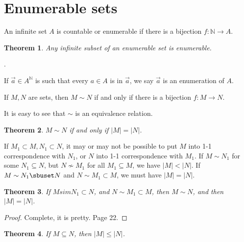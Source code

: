 \documentclass[a4paper, 12pt]{article}
\newtheorem{theorem}{Theorem}
\newtheorem{theorem}{Theorem}
\newtheorem{proof}{Proof}
\begin{document}
\section{Enumerable sets}    

\begin{definition}
    An infinite set $A$ is countable or enumerable if there is a bijection 
    $f : \mathbb{N} \to A$.
\end{definition}

\begin{theorem}
    Any infinite subset of an enumerable set is enumerable.
\end{theorem}

\begin{profe}
    .
\end{profe}

If $\overrightarrow{a} \in A^\mathbb{N}$ is such that every $a \in A$ is in 
$\overrightarrow{a}$, we say $\overrightarrow{a}$ is an enumeration 
of $A$.

\begin{definition}
    If $M, N$ are sets, then $M \sim N$ if and only if there is a bijection 
    $f : M \to  N$.
\end{definition}

It is easy to see that $\sim$ is an equivalence relation. 

\begin{theorem}
    $M \sim N$ if and only if $|M| = |N|$.
\end{theorem}

If $M_1 \subset M, N_1 \subset N$, it may or may not be possible to put 
$M$ into 1-1 correspondence with $N_1$, or $N$ into 1-1 correspondence 
with $M_1$. If $M \sim N_1$ for some $N_1 \subseteq N$, but $N \not\sim M_1$
for all $M_1\subseteq M$, we have $|M| < |N|$. If 
$M \sim N_1 \sbuset N$ and $N \sim M_1 \subset M$, we must have 
$|M| = |N|$.

\begin{theorem}
    If $M simN_1 \subset N$, and $N \sim M_1 \subset M$, then 
    $M \sim N$, and then $|M| = |N|$.
\end{theorem}

\begin{proof}
    Complete, it is pretty. Page 22.
\end{proof}

\begin{theorem}
    If $M \subseteq N$, then $|M| \leq |N|$.
\end{theorem}
\end{document}
